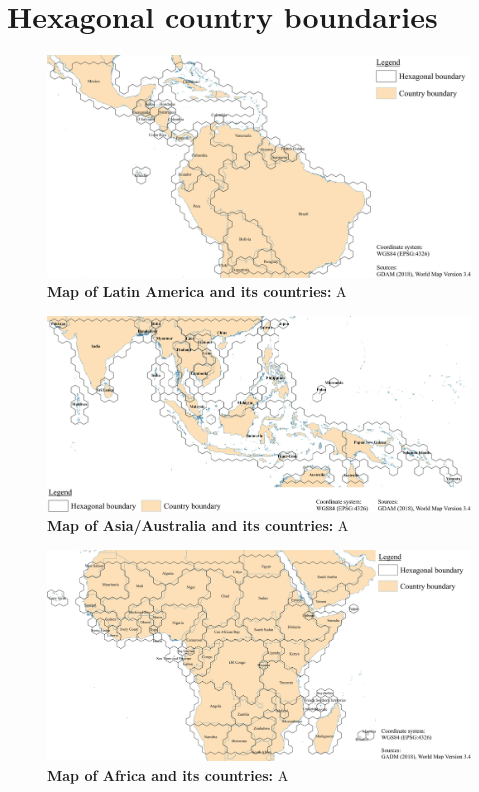 \appendix
\chapter{Hexagonal country boundaries}
\label{ch:appendix_a}
	\begin{figure}[ht]
		\centering
		\includegraphics[scale=1.]{img/americas_hexagonal_boundaries}
		\caption[Map of Latin America and its countries]{\textbf{Map of Latin America and its countries:} A}
		\label{fig:americas_hexagonal_appendix}
	\end{figure}
	\begin{figure}[ht]
		\centering
		\includegraphics[scale=1.]{img/asia_hexagonal_boundaries}
		\caption[Map of Asia/Australia and its countries]{\textbf{Map of Asia/Australia and its countries:} A}
		\label{fig:asia_hexagonal_appendix}
	\end{figure}
	\begin{figure}[t]
		\centering
		\includegraphics[scale=.98]{img/africa_hexagonal_boundaries}
		\caption[Map of Africa and its countries]{\textbf{Map of Africa and its countries:} A}
		\label{fig:africa_hexagonal_appendix}
	\end{figure}

